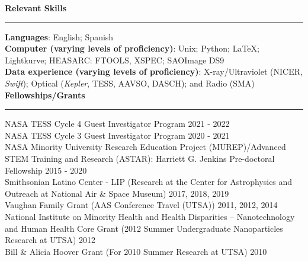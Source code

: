 \documentclass[letter,11pt]{article}
\begin{document}
\noindent
{\bf Relevant Skills} \\
\vspace{-10mm}
\begin{center}
\rule{\textwidth}{0.2mm}
\end{center}
\vspace{-3mm}
\noindent
\textbf{Languages}: English; Spanish\\
\textbf{Computer (varying levels of proficiency)}: Unix; Python; LaTeX; Lightkurve; HEASARC: FTOOLS, XSPEC; SAOImage DS9 \\
\textbf{Data experience (varying levels of proficiency)}: X-ray/Ultraviolet (NICER, {\it Swift}); Optical ({\it Kepler}, TESS, AAVSO, DASCH); and Radio (SMA) \\

\noindent
{\bf Fellowships/Grants} \\
\vspace{-10mm}
\begin{center}
\rule{\textwidth}{0.2mm}
\end{center}
\vspace{-3mm}
\noindent
NASA TESS Cycle 4 Guest Investigator Program \hfill 2021 - 2022 \\
NASA TESS Cycle 3 Guest Investigator Program \hfill 2020 - 2021 \\
NASA Minority University Research Education Project (MUREP)/Advanced STEM Training and Research (ASTAR): Harriett G. Jenkins Pre-doctoral Fellowship \hfill 2015 - 2020 \\
Smithsonian Latino Center - LIP (Research at the Center for Astrophysics and Outreach at National Air \& Space Museum) \hfill 2017, 2018, 2019 \\
Vaughan Family Grant (AAS Conference Travel (UTSA)) \hfill 2011, 2012, 2014 \\
National Institute on Minority Health and Health Disparities – Nanotechnology and Human Health Core Grant (2012 Summer Undergraduate Nanoparticles Research at UTSA) \hfill 2012 \\
Bill \& Alicia Hoover Grant (For 2010 Summer Research at UTSA) \hfill 2010 \\
\end{document}
